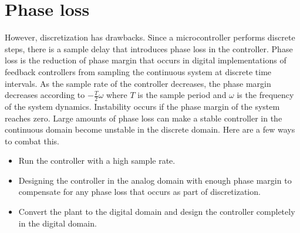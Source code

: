 \section{Phase loss}
\label{sec:phase_loss}

However, \gls{discretization} has drawbacks. Since a microcontroller performs
discrete steps, there is a sample delay that introduces phase loss in the
controller. Phase loss is the reduction of \gls{phase margin} that occurs in
digital implementations of feedback controllers from sampling the continuous
\gls{system} at discrete time intervals. As the sample rate of the controller
decreases, the \gls{phase margin} decreases according to $-\frac{T}{2}\omega$
where $T$ is the sample period and $\omega$ is the frequency of the \gls{system}
dynamics. Instability occurs if the \gls{phase margin} of the \gls{system}
reaches zero. Large amounts of phase loss can make a stable controller in the
continuous domain become unstable in the discrete domain. Here are a few ways to
combat this.

\begin{itemize}
  \item Run the controller with a high sample rate.
  \item Designing the controller in the analog domain with enough
    \gls{phase margin} to compensate for any phase loss that occurs as part of
    \gls{discretization}.
  \item Convert the \gls{plant} to the digital domain and design the controller
    completely in the digital domain.
\end{itemize}
